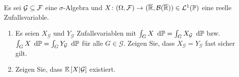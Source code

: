 \begin{exercisePage}
	
	\newcommand{\mathG}{\ensuremath{\mathcal{G}}}
	\begin{homework}
		Es sei $\mathcal{G} \subseteq \mathcal{F}$ eine $\sigma$-Algebra und $\abb{X}{(\Omega, \ereignisF)}{(\quer{\R}, \borel{\quer{\R}})} \in \L^1(\P)$ eine reelle Zufallsvariable. 
		\begin{enumerate}[leftmargin=*, nolistsep]
			\item Es seien $X_{\mathG}$ und $Y_{\mathG}$ Zufallsvariablen mit $\int_G X \diff{\P} = \int_G X_{\mathG} \diff{\P}$ bzw. $\int_G X \diff{\P} = \int_G Y_{\mathG} \diff{\P}$ für alle $G \in \mathG$. Zeigen Sie, dass $X_{\mathG} = Y_{\mathG}$ fast sicher gilt.
			\item Zeigen Sie, dass $\EW[X|\mathG]$ existiert.
		\end{enumerate}
	\end{homework}
	

\end{exercisePage}
